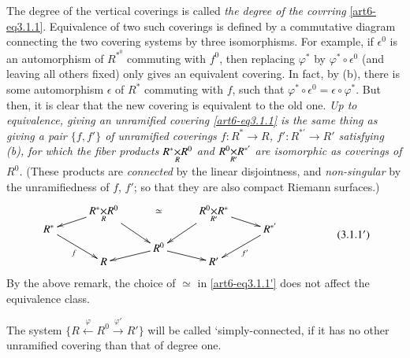 The degree of the vertical coverings is called \textit{the degree of the covrring} \eqref{art6-eq3.1.1}. Equivalence of two such coverings is defined by a commutative diagram connecting the two covering systems by three isomorphisms. For example, if $\epsilon^0$ is an automorphism of $R^{\ast^0}$ commuting with $f^0$, then replacing $\varphi^\ast$ by  $\varphi^\ast \circ \epsilon^0$ (and leaving all others fixed) only gives an equivalent covering. In fact, by (b), there is some automorphism $\epsilon$ of $R^\ast$ commuting with $f$, such that $\varphi^\ast \circ \epsilon^0 = \epsilon \circ \varphi^\ast$. But then, it is clear that the new covering is equivalent to the old one. \textit{Up to equivalence, giving an unramified covering \eqref{art6-eq3.1.1} is the same thing as giving a pair $\{f, f'\}$ of unramified coverings $f: R^\ast \longrightarrow R$, $f' : R^{\ast'} \longrightarrow R'$ satisfying (b), for which the fiber products $\fprod{R^\ast}{R^0}{R}$ and $\fprod{R^0}{R^{\ast'}}{R'}$ are isomorphic as coverings of $R^0$.}
(These products are \textit{connected} by the linear disjointness, and \textit{non-singular} by the unramifiedness of $f$, $f'$; so that they are also compact Riemann surfaces.)
\begin{equation*}
\vcenter{
\xymatrix@R=-0.05cm@C=0.9cm{
& \fprod{R^\ast}{R^0}{R} \ar[dddr] \ar[dl]  & \simeq & \fprod{R^0}{R^{\ast}}{R'} \ar[dr] \ar[dddl] & \\
R^\ast\ar[dddr]_-f & & & & R^{\ast'}\ar[dddl]^-{f'}\\
& & & & & \\
& & R^0 \ar[dr] \ar[dl] & & \\
& R & & R' &
}}\tag*{(3.1.1$'$)}\label{art6-eq3.1.1'}
\end{equation*}
By the above remark, the choice of $\simeq$ in \eqref{art6-eq3.1.1'} does not affect the equivalence class.

\begin{defi*}
The system $\{R \xleftarrow{\varphi} R^0 \xrightarrow{\varphi'} R'\}$ will be called `simply-connected, if it has no other unramified covering than that of degree one.
\end{defi*}

